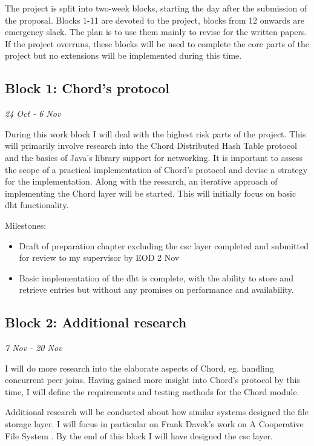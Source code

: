 \documentclass[12pt]{article}
\begin{document}
The project is split into two-week blocks, starting the day after the submission of the proposal. Blocks 1-11 are devoted to the project, blocks from 12 onwards are emergency slack. The plan is to use them mainly to revise for the written papers. If the project overruns, these blocks will be used to complete the core parts of the project but no extensions will be implemented during this time.


\subsection{Block 1: Chord's protocol}
\emph{24 Oct - 6 Nov}  %

During this work block I will deal with the highest risk parts of the project. This will primarily involve research into the Chord Distributed Hash Table protocol and the basics of Java's library support for networking. It is important to assess the scope of a practical implementation of Chord's protocol and devise a strategy for the implementation. Along with the research, an iterative approach of implementing the Chord layer will be started. This will initially focus on basic \gls{dht} functionality.


Milestones:
\begin{itemize}
\item{Draft of preparation chapter excluding the \gls{csc} layer completed and submitted for review to my supervisor by EOD 2 Nov}
\item{Basic implementation of the \gls{dht} is complete, with the ability to store and retrieve entries but without any promises on performance and availability.}
\end{itemize}


\subsection{Block 2: Additional research}
\emph{7 Nov - 20 Nov}  %

I will do more research into the elaborate aspects of Chord, eg. handling concurrent peer joins. Having gained more insight into Chord's protocol by this time, I will define the requirements and testing methods for the Chord module. 

Additional research will be conducted about how similar systems designed the file storage layer. I will focus in particular on Frank Davek's work on A Cooperative File System \cite{dabekcfs}. By the end of this block I will have designed the \gls{csc} layer.
\end{document}
